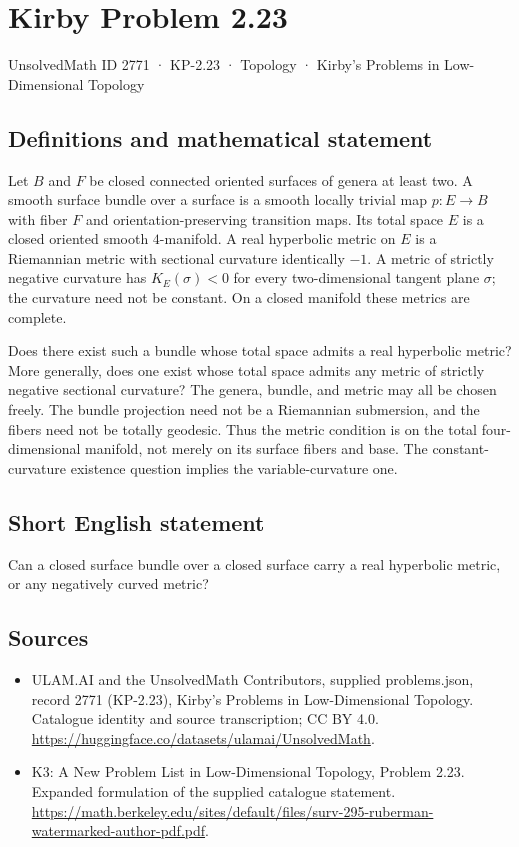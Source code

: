 \documentclass[11pt,a4paper]{article}
\begin{document}
\section*{Kirby Problem 2.23}\label{2771}
{\small UnsolvedMath ID 2771 · KP-2.23 · Topology · Kirby's Problems in Low-Dimensional Topology}
\subsection{Definitions and mathematical statement}
Let $B$ and $F$ be closed connected oriented surfaces of genera at least two.
A smooth surface bundle over a surface is a smooth locally trivial map
$p:E\to B$ with fiber $F$ and orientation-preserving transition maps. Its total
space $E$ is a closed oriented smooth $4$-manifold.
A real hyperbolic metric on $E$ is a Riemannian metric with sectional curvature
identically $-1$. A metric of strictly negative curvature has
$K_E(\sigma)<0$ for every two-dimensional tangent plane $\sigma$; the curvature
need not be constant. On a closed manifold these metrics are complete.

Does there exist such a bundle whose total space admits a real hyperbolic
metric? More generally, does one exist whose total space admits any metric
of strictly negative sectional curvature?
The genera, bundle, and metric may all be chosen freely. The bundle projection
need not be a Riemannian submersion, and the fibers need not be totally
geodesic. Thus the metric condition is on the total four-dimensional manifold,
not merely on its surface fibers and base. The constant-curvature existence
question implies the variable-curvature one.
\subsection{Short English statement}
Can a closed surface bundle over a closed surface carry a real hyperbolic metric, or any negatively curved metric?
\subsection{Sources}
\begin{itemize}
\item[S1] ULAM.AI and the UnsolvedMath Contributors, supplied problems.json, record 2771 (KP-2.23), Kirby's Problems in Low-Dimensional Topology. Catalogue identity and source transcription; CC BY 4.0.
\url{https://huggingface.co/datasets/ulamai/UnsolvedMath}.
\item[S2] K3: A New Problem List in Low-Dimensional Topology, Problem 2.23. Expanded formulation of the supplied catalogue statement.
\url{https://math.berkeley.edu/sites/default/files/surv-295-ruberman-watermarked-author-pdf.pdf}.
\end{itemize}
\end{document}
